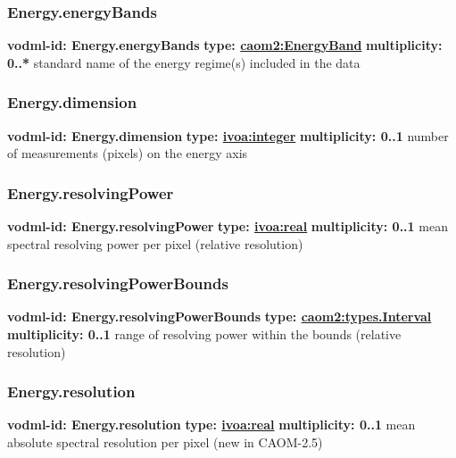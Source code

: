     \subsubsection{Energy.energyBands}
      \textbf{vodml-id: Energy.energyBands} \newline
      \textbf{type: \hyperref[sect:EnergyBand]{caom2:EnergyBand}} \newline
      \textbf{multiplicity: 0..*} \newline
      standard name of the energy regime(s) included in the data

    \subsubsection{Energy.dimension}
      \textbf{vodml-id: Energy.dimension} \newline
      \textbf{type: \hyperref[sect:ivoa]{ivoa:integer}} \newline
      \textbf{multiplicity: 0..1} \newline
      number of measurements (pixels) on the energy axis

    \subsubsection{Energy.resolvingPower}
      \textbf{vodml-id: Energy.resolvingPower} \newline
      \textbf{type: \hyperref[sect:ivoa]{ivoa:real}} \newline
      \textbf{multiplicity: 0..1} \newline
      mean spectral resolving power per pixel (relative resolution)

    \subsubsection{Energy.resolvingPowerBounds}
      \textbf{vodml-id: Energy.resolvingPowerBounds} \newline
      \textbf{type: \hyperref[sect:types.Interval]{caom2:types.Interval}} \newline
      \textbf{multiplicity: 0..1} \newline
      range of resolving power within the bounds (relative resolution)

    \subsubsection{Energy.resolution}
      \textbf{vodml-id: Energy.resolution} \newline
      \textbf{type: \hyperref[sect:ivoa]{ivoa:real}} \newline
      \textbf{multiplicity: 0..1} \newline
      mean absolute spectral resolution per pixel (new in CAOM-2.5)

